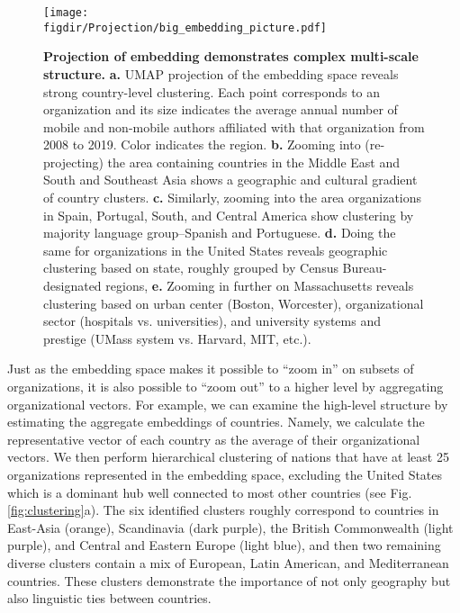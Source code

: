 \documentclass[12pt]{article} %
\def\figdir{../Figs}
\begin{document}
\begin{figure}[hp!]
	\centering
	\texttt{[image: \\figdir/Projection/big\_embedding\_picture.pdf]}
	\caption{
		\textbf{Projection of embedding demonstrates complex multi-scale structure.}
		\textbf{a.}
		UMAP projection \autocite{mcinnes2018umap} of the embedding space reveals strong country-level clustering.
		Each point corresponds to an organization and its size indicates the average annual number of mobile and non-mobile authors affiliated with that organization from 2008 to 2019. 
		Color indicates the region.
		\textbf{b.} Zooming into (re-projecting) the area containing countries in the Middle East and South and Southeast Asia shows a geographic and cultural gradient of country clusters. 
		\textbf{c.} Similarly, zooming into the area organizations in Spain, Portugal, South, and Central America show clustering by majority language group--Spanish and Portuguese.
		\textbf{d.} Doing the same for organizations in the United States reveals geographic clustering based on state, roughly grouped by Census Bureau-designated regions,
		\textbf{e.} Zooming in further on Massachusetts reveals clustering based on urban center (Boston, Worcester), organizational sector (hospitals vs. universities), and university systems and prestige (UMass system vs. Harvard, MIT, etc.).
	}
	\label{fig:projection}
\end{figure}


Just as the embedding space makes it possible to ``zoom in'' on subsets of organizations, it is also possible to ``zoom out'' to a higher level by aggregating organizational vectors. 
For example, we can examine the high-level structure by estimating the aggregate embeddings of countries. 
Namely, we calculate the representative vector of each country as the average of their organizational vectors.
We then perform hierarchical clustering of nations that have at least 25 organizations represented in the embedding space, excluding the United States which is a dominant hub well connected to most other countries (see Fig. \ref{fig:clustering}a). 
The six identified clusters roughly correspond to countries in East-Asia (orange), Scandinavia (dark purple), the British Commonwealth (light purple), and Central and Eastern Europe (light blue), and then two remaining diverse clusters contain a mix of European, Latin American, and Mediterranean countries.
These clusters demonstrate the importance of not only geography but also linguistic ties between countries.
\end{document}
